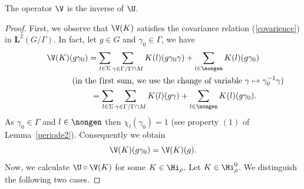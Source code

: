 \begin{proposition}
The operator $\V$ is the inverse of $\U$.
\end{proposition}
\begin{proof}
First, we observe that $\V(K)$ satisf\/ies  the covariance relation
(\ref{covarience}) in $\mathbf{L}^2(G/\Gamma)$. In fact, let $g\in
G$ and $\gamma_0\in \Gamma$, we have
\begin{gather*}
\V(K)(g\gamma_0)   =  \sum_{l\in \Sigma} \sum_{\gamma\in
\Gamma/\Gamma\cap M} K(l)(g\gamma_0\gamma)+ \sum _{l\in
\nongen} K(l)(g\gamma_0)\\
\phantom{\V(K)(g\gamma_0)   =}{}   (\mbox{in the f\/irst sum, we use the  change of variable  }
\gamma\mapsto \gamma_0^{-1}\gamma)\\
\phantom{\V(K)(g\gamma_0)}{}  =  \sum_{l\in \Sigma} \sum_{\gamma\in \Gamma/\Gamma\cap M}
K(l)(g\gamma)+ \sum _{l\in \nongen} K(l)(g\gamma_0).
\end{gather*}
 As $\gamma_0\in \Gamma$ and $l\in \nongen$ then
 $\chi_l(\gamma_0)=1$ (see property $(1)$ of Lemma~\ref{periode2}).
 Consequently we obtain
\[
\V(K)(g\gamma_0)=\V(K)(g).
\]
 Now, we calculate $\U\circ \V (K)$
for some $K\in  \Hi_\rho$.
  Let $K\in \Hi_\rho^0$. We distinguish the following two cases.


\end{proof}
